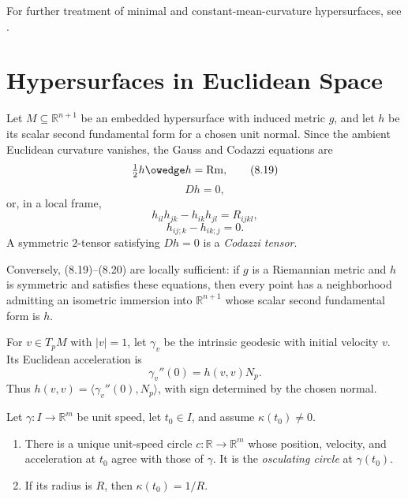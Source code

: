 For further treatment of minimal and constant-mean-curvature hypersurfaces,
see \cite{CM11}.
\section{Hypersurfaces in Euclidean Space}

Let $M\subseteq\mathbb R^{n+1}$ be an embedded hypersurface with induced
metric $g$, and let $h$ be its scalar second fundamental form for a chosen unit
normal.  Since the ambient Euclidean curvature vanishes, the Gauss and Codazzi
equations are
\begin{equation}
\tfrac12h\owedge h=\mathrm{Rm}, \tag{8.19}
\end{equation}
\begin{equation}
Dh=0, \tag{8.20}
\end{equation}
or, in a local frame,
\begin{equation}
h_{il}h_{jk}-h_{ik}h_{jl}=R_{ijkl}, \tag{8.21}
\end{equation}
\begin{equation}
h_{ij;k}-h_{ik;j}=0. \tag{8.22}
\end{equation}
A symmetric $2$-tensor satisfying $Dh=0$ is a \emph{Codazzi tensor}.

Conversely, (8.19)--(8.20) are locally sufficient: if $g$ is a Riemannian
metric and $h$ is symmetric and satisfies these equations, then every point
has a neighborhood admitting an isometric immersion into $\mathbb R^{n+1}$
whose scalar second fundamental form is $h$.

For $v\in T_pM$ with $|v|=1$, let $\gamma_v$ be the intrinsic geodesic with
initial velocity $v$.  Its Euclidean acceleration is
\[
\gamma_v''(0)=h(v,v)N_p.
\]
Thus $h(v,v)=\langle\gamma_v''(0),N_p\rangle$, with sign determined by the
chosen normal.

\begin{proposition}
\label{prop:osculating-circle}
Let $\gamma:I\to\mathbb R^m$ be unit speed, let $t_0\in I$, and assume
$\kappa(t_0)\ne0$.
\begin{enumerate}
\item[(a)] There is a unique unit-speed circle
$c:\mathbb R\to\mathbb R^m$ whose position, velocity, and acceleration at
$t_0$ agree with those of $\gamma$.  It is the \emph{osculating circle} at
$\gamma(t_0)$.
\item[(b)] If its radius is $R$, then $\kappa(t_0)=1/R$.
\end{enumerate}
\end{proposition}

